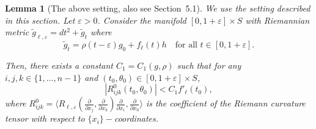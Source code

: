 \documentclass[10pt]{amsart}
\newtheorem{lemma}[theorem]{Lemma}
\theoremstyle{definition}
\let\eps\varepsilon
\renewcommand{\>}{{\rangle}}
\newcommand{\<}{{\langle}}
\begin{document}
\begin{lemma}[The above setting, also see Section~5.1]\label{lem: bdd_curv_tensor_C12}
We use the setting described in this section. Let $\eps>0$. Consider the manifold $[0,1+\eps]\times S$ with Riemannian metric $\tilde g_{\ell,\eps}=dt^2+\tilde g_t$ where
\begin{equation*}
\tilde g_t = \rho(t-\eps)g_0+f_\ell(t)h \quad \text{for all } t\in [0,1+\eps].
\end{equation*}

Then, there exists a constant $C_1=C_1(g, \rho)$ such that for any $i,j,k\in\{1,\dots,n-1\}$ and $(t_0,\theta_0)\in[0,1+\eps]\times S$,
\begin{equation*}
|R^0_{ijk}(t_0,\theta_0)|<C_1f'_\ell(t_0),
\end{equation*}
where $R^0_{ijk} = \langle R_{\ell,\eps}(\frac{\partial}{\partial x_j},\frac{\partial}{\partial x_k})\frac{\partial}{\partial x_i},\frac{\partial}{\partial x_0}\rangle$ is the coefficient of the Riemann curvature tensor with respect to $\{x_i\}-$coordinates.
\end{lemma}
\end{document}
